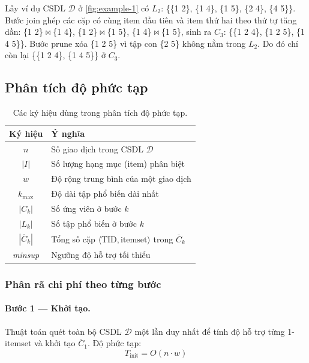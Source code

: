 Lấy ví dụ CSDL $\mathcal{D}$ ở \autoref{fig:example-1} có $L_2$: \{\{1 2\}, \{1 4\}, \{1 5\}, \{2 4\}, \{4 5\}\}. Bước join ghép các cặp có cùng item đầu tiên và item thứ hai theo thứ tự tăng dần: \{1 2\}$\bowtie$\{1 4\}, \{1 2\}$\bowtie$\{1 5\}, \{1 4\}$\bowtie$\{1 5\}, sinh ra $C_3$: \{\{1 2 4\}, \{1 2 5\}, \{1 4 5\}\}. Bước prune xóa \{1 2 5\} vì tập con \{2 5\} không nằm trong $L_2$. Do đó chỉ còn lại \{\{1 2 4\}, \{1 4 5\}\} ở $C_3$.

\subsection{Phân tích độ phức tạp}

\begin{table}[h]
\centering
\begin{tabular}{cl}
\hline
\textbf{Ký hiệu} & \textbf{Ý nghĩa} \\
\hline
$n$           & Số giao dịch trong CSDL $\mathcal{D}$ \\
$|I|$         & Số lượng hạng mục (item) phân biệt \\
$w$           & Độ rộng trung bình của một giao dịch \\
$k_{\max}$    & Độ dài tập phổ biến dài nhất \\
$|C_k|$       & Số ứng viên ở bước $k$ \\
$|L_k|$       & Số tập phổ biến ở bước $k$ \\
$|\overline{C}_k|$ & Tổng số cặp $\langle\text{TID}, \text{itemset}\rangle$ trong $\overline{C}_k$ \\
\textit{minsup} & Ngưỡng độ hỗ trợ tối thiểu \\
\hline
\end{tabular}
\caption{Các ký hiệu dùng trong phân tích độ phức tạp.}
\label{tab:complexity-notation}
\end{table}

\subsubsection{Phân rã chi phí theo từng bước}

\paragraph{Bước 1 — Khởi tạo.}
Thuật toán quét toàn bộ CSDL $\mathcal{D}$ một lần duy nhất để tính độ hỗ trợ
từng 1-itemset và khởi tạo $\overline{C}_1$. Độ phức tạp:
\begin{equation}
    \label{eq:equation-1-5a}
    T_{\text{init}} = O(n \cdot w)
\end{equation}

